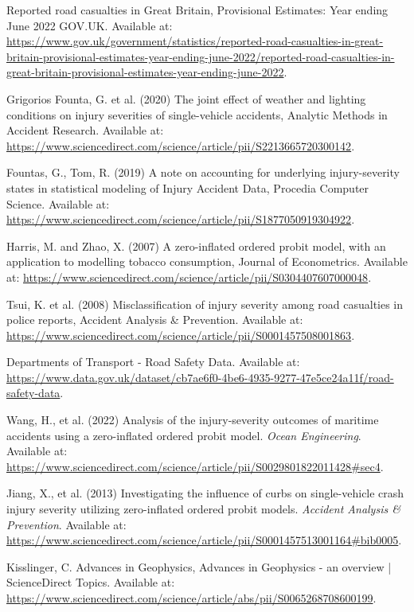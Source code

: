\documentclass[12]{report}
\begin{document}
\begin{thebibliography}{9}
Reported road casualties in Great Britain, Provisional Estimates: Year ending June 2022 GOV.UK. Available at: \url{https://www.gov.uk/government/statistics/reported-road-casualties-in-great-britain-provisional-estimates-year-ending-june-2022/reported-road-casualties-in-great-britain-provisional-estimates-year-ending-june-2022}.

Grigorios Founta, G. et al. (2020) The joint effect of weather and lighting conditions on injury severities of single-vehicle accidents, Analytic Methods in Accident Research. Available at: \url{https://www.sciencedirect.com/science/article/pii/S2213665720300142}.

Fountas, G., Tom, R. (2019) A note on accounting for underlying injury-severity states in statistical modeling of Injury Accident Data, Procedia Computer Science. Available at: \url{https://www.sciencedirect.com/science/article/pii/S1877050919304922}.

Harris, M. and Zhao, X. (2007) A zero-inflated ordered probit model, with an application to modelling tobacco consumption, Journal of Econometrics. Available at: \url{https://www.sciencedirect.com/science/article/pii/S0304407607000048}.

Tsui, K. et al. (2008) Misclassification of injury severity among road casualties in police reports, Accident Analysis \& Prevention. Available at: \url{https://www.sciencedirect.com/science/article/pii/S0001457508001863}.

Departments of Transport -  Road Safety Data. Available at: \url{https://www.data.gov.uk/dataset/cb7ae6f0-4be6-4935-9277-47e5ce24a11f/road-safety-data}. 

Wang, H., et al. (2022) Analysis of the injury-severity outcomes of maritime accidents using a zero-inflated ordered probit model. \textit{Ocean Engineering}. Available at: \url{https://www.sciencedirect.com/science/article/pii/S0029801822011428#sec4}.

Jiang, X., et al. (2013) Investigating the influence of curbs on single-vehicle crash injury severity utilizing zero-inflated ordered probit models. \textit{Accident Analysis \& Prevention}. Available at: \url{https://www.sciencedirect.com/science/article/pii/S0001457513001164#bib0005}.

Kisslinger, C. Advances in Geophysics, Advances in Geophysics - an overview | ScienceDirect Topics. Available at: \url{https://www.sciencedirect.com/science/article/abs/pii/S0065268708600199}.


\end{thebibliography}
\end{document}
